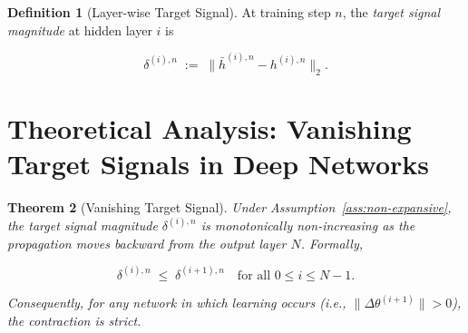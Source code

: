 \documentclass{article}
\theoremstyle{plain}
\newtheorem{theorem}{Theorem}[section]
\theoremstyle{definition}
\newtheorem{definition}[theorem]{Definition}
\theoremstyle{remark}
\begin{document}
\begin{definition}[Layer-wise Target Signal]
\label{def:target-signal}
At training step $n$, the \emph{target signal magnitude} at hidden layer $i$ is

$$\delta^{(i), n} \;:=\; \bigl\|\bar{h}^{(i), n} - h^{(i), n}\bigr\|_2.$$

\section{Theoretical Analysis: Vanishing Target Signals in Deep Networks}
\label{sec:vanishing}
\label{sec:theory}

\end{definition}

\begin{theorem}[Vanishing Target Signal]
\label{thm:vanishing-target}
\label{thm:vanishing}
Under Assumption~\ref{ass:non-expansive}, the target signal magnitude $\delta^{(i), n}$ is monotonically non-increasing as the propagation moves backward from the output layer $N$. Formally,

$$\delta^{(i), n} \;\leq\; \delta^{(i+1), n} \quad \text{for all } 0 \leq i \leq N-1.$$

Consequently, for any network in which learning occurs (i.e., $\|\Delta \theta^{(i+1)}\| > 0$), the contraction is strict.
\end{theorem}
\end{document}
